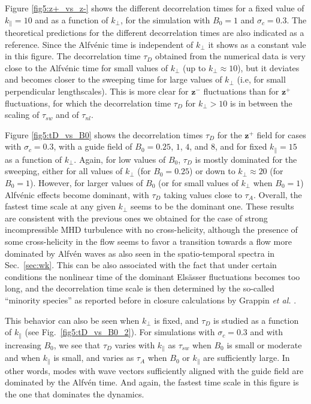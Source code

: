\documentclass[aip,pop,reprint,amsmath,amssymb,floatfix]{revtex4-1}
\renewcommand{\vec}[1]{\mathbf{#1}}
\begin{document}
Figure \ref{fig5:z+_vs_z-} shows the different decorrelation times for
a fixed value of $k_{\parallel}=10$ and as a function of $k_{\perp}$,
for the simulation with $B_0=1$ and $\sigma_c=0.3$. The theoretical
predictions for the different decorrelation times are also indicated
as a reference. Since the Alfv\'enic time is independent of
$k_{\perp}$ it shows as a constant vale in this figure. The
decorrelation time $\tau_D$ obtained from the numerical data is very
close to the Alfv\'enic time for small values of $k_{\perp}$ (up to
$k_\perp \approx 10$), but it deviates and becomes closer to the
sweeping time for large values of $k_{\perp}$ (i.e, for small
perpendicular lengthscales). This is more clear for $\vec{z}^-$
fluctuations than for $\vec{z}^+$ fluctuations, for which the
decorrelation time $\tau_D$ for $k_\perp > 10$ is in between the
scaling of $\tau_{sw}$ and of $\tau_{nl}$.

Figure \ref{fig5:tD_vs_B0} shows the decorrelation times $\tau_D$ for
the $\vec{z}^+$ field for cases with $\sigma_c = 0.3$, with a guide field
of $B_0=0.25$, $1$, $4$, and $8$, and for fixed $k_\parallel = 15$ as
a function of $k_\perp$. Again, for low values of $B_0$, $\tau_D$ is
mostly dominated for the sweeping, either for all values of $k_\perp$
(for $B_0=0.25$) or down to $k_\perp \approx 20$ (for
$B_0=1$). However, for larger values of $B_0$ (or for small values of
$k_\perp$ when $B_0=1$) Alfv\'enic effects become dominant, with
$\tau_D$ taking values close to $\tau_{A}$. Overall, the fastest time
scale at any given $k_\perp$ seems to be the dominant one. These
results are consistent with the previous ones we obtained
\cite{lugones_2016_spatiotemporal} for the case of strong
incompressible MHD turbulence with no cross-helicity, although the
presence of some cross-helicity in the flow seems to favor a
transition towards a flow more dominated by Alfv\'en waves as also
seen in the spatio-temporal spectra in Sec.~\ref{sec:wk}. This can be 
also associated with the fact that under certain conditions the nonlinear
time of the dominant Els\"asser fluctuations becomes too long, and the 
decorrelation time scale is then determined by the so-called 
``minority species'' as reported before in closure calculations by 
Grappin \textit{et al.} \cite{grappin_1983_dependence}.

This behavior can also be seen when $k_\perp$ is fixed, and $\tau_D$
is studied as a function of $k_\parallel$ (see
Fig.~\ref{fig5:tD_vs_B0_2}). For simulations with $\sigma_c=0.3$ and with
increasing $B_0$, we see that $\tau_D$ varies with $k_\parallel$ as
$\tau_{sw}$ when $B_0$ is small or moderate and when $k_\parallel$ is
small, and varies as $\tau_A$ when $B_0$ or $k_\parallel$ are
sufficiently large. In other words, modes with wave vectors
sufficiently aligned with the guide field are dominated by the
Alfv\'en time. And again, the fastest time scale in this figure is the
one that dominates the dynamics.
\end{document}
